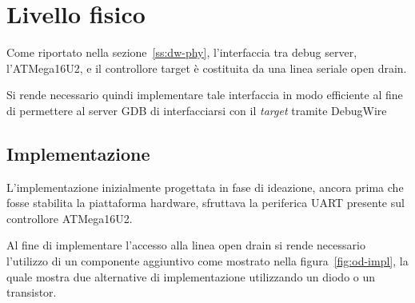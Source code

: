 \chapter{Livello fisico}

Come riportato nella sezione~\ref{ss:dw-phy}, l'interfaccia tra debug server, l'ATMega16U2, e il controllore target è costituita da una linea seriale open drain.

Si rende necessario quindi implementare tale interfaccia in modo efficiente al fine di permettere al server GDB di interfacciarsi con il \textit{target} tramite DebugWire

\section{Implementazione}

L'implementazione inizialmente progettata in fase di ideazione, ancora prima che fosse stabilita la piattaforma hardware, sfruttava la periferica UART presente sul controllore ATMega16U2\cite[chap. 18]{avr:m16u2}.

Al fine di implementare l'accesso alla linea open drain si rende necessario l'utilizzo di un componente aggiuntivo come mostrato nella figura~\ref{fig:od-impl}, la quale mostra due alternative di implementazione utilizzando un diodo o un transistor. 


